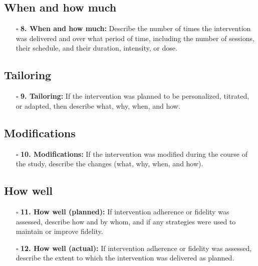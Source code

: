 \documentclass[11pt]{article}
\def\tightlist{}
\begin{document}
\begin{Form}
\subsection{When and how much}\label{when-and-how-much}

\begin{itemize}
\tightlist
\item[$\square$]
  \textbf{8. When and how much:} Describe the number of times the
  intervention was delivered and over what period of time, including the
  number of sessions, their schedule, and their duration, intensity, or
  dose.
\end{itemize}

\subsection{Tailoring}\label{tailoring}

\begin{itemize}
\tightlist
\item[$\square$]
  \textbf{9. Tailoring:} If the intervention was planned to be
  personalized, titrated, or adapted, then describe what, why, when, and
  how.
\end{itemize}

\subsection{Modifications}\label{modifications}

\begin{itemize}
\tightlist
\item[$\square$]
  \textbf{10. Modifications:} If the intervention was modified during
  the course of the study, describe the changes (what, why, when, and
  how).
\end{itemize}

\subsection{How well}\label{how-well}

\begin{itemize}
\tightlist
\item[$\square$]
  \textbf{11. How well (planned):} If intervention adherence or fidelity
  was assessed, describe how and by whom, and if any strategies were
  used to maintain or improve fidelity.
\item[$\square$]
  \textbf{12. How well (actual):} If intervention adherence or fidelity
  was assessed, describe the extent to which the intervention was
  delivered as planned.
\end{itemize}


\end{Form}
\end{document}
